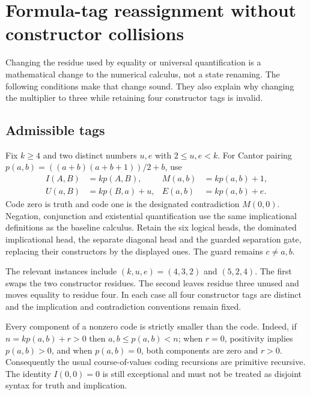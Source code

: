 \section{Formula-tag reassignment without constructor collisions}
\label{sec:tag-reassignment}

Changing the residue used by equality or universal quantification is a
mathematical change to the numerical calculus, not a state renaming. The
following conditions make that change sound. They also explain why changing
the multiplier to three while retaining four constructor tags is invalid.

\subsection{Admissible tags}

Fix $k\ge4$ and two distinct numbers $u,e$ with $2\le u,e<k$.
For Cantor pairing $p(a,b)=((a+b)(a+b+1))/2+b$, use
\begin{align*}
 I(A,B)&=kp(A,B), & M(a,b)&=kp(a,b)+1,\\
 U(a,B)&=kp(B,a)+u, & E(a,b)&=kp(a,b)+e.
\end{align*}
Code zero is truth and code one is the designated contradiction $M(0,0)$.
Negation, conjunction and existential quantification use the same
implicational definitions as the baseline calculus. Retain the six logical
heads, the dominated implicational head, the separate diagonal head and the
guarded separation gate, replacing their constructors by the displayed ones.
The guard remains $c\ne a,b$.

The relevant instances include $(k,u,e)=(4,3,2)$ and $(5,2,4)$. The first
swaps the two constructor residues. The second leaves residue three unused
and moves equality to residue four. In each case all four constructor tags
are distinct and the implication and contradiction conventions remain fixed.

Every component of a nonzero code is strictly smaller than the code. Indeed,
if $n=kp(a,b)+r>0$ then $a,b\le p(a,b)<n$; when $r=0$, positivity implies
$p(a,b)>0$, and when $p(a,b)=0$, both components are zero and $r>0$.
Consequently the usual course-of-values coding recursions are primitive
recursive. The identity $I(0,0)=0$ is still exceptional and must not be
treated as disjoint syntax for truth and implication.

